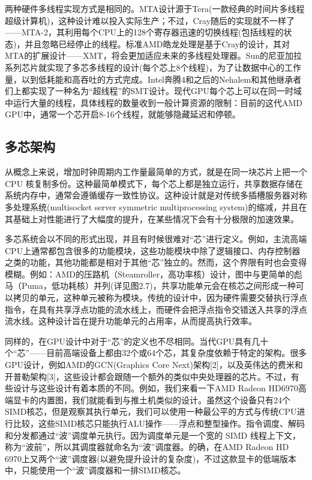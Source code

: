
两种硬件多线程实现方式是相同的。MTA设计源于Tera(一款经典的时间片多线程超级计算机)，这种设计难以投入实际生产；不过，Cray随后的实现就不一样了——MTA-2，其利用每个CPU上的128个寄存器迅速的切换线程(包括线程的状态)，并且忽略已经停止的线程。标准AMD皓龙处理是基于Cray的设计，其对MTA的扩展设计——XMT，将会更加适应未来的多线程处理器。Sun的尼亚加拉系列芯片就实现了多芯多线程的设计(每个芯上8个线程)，为了让数据中心的工作量，以到低耗能和高吞吐的方式完成。Intel奔腾4和之后的Nehalem和其他继承者们上都实现了一种名为“超线程”的SMT设计。现代GPU每个芯上可以在同一时域中运行大量的线程，具体线程的数量收到一般计算资源的限制：目前的这代AMD GPU中，通常一个芯开启8-16个线程，就能够隐藏延迟和停顿。

\subsection{多芯架构}

从概念上来说，增加时钟周期内工作量最简单的方式，就是在同一块芯片上把一个 CPU 核复制多份。这种最简单模式下，每个芯上都是独立运行，共享数据存储在系统内存中，通常会遵循缓存一致性协议。这种设计就是对传统多插槽服务器对称多处理系统(multisocket server symmetric multiprocessing system)的缩减，并且在其基础上对性能进行了大幅度的提升，在某些情况下会有十分极限的加速效果。

多芯系统会以不同的形式出现，并且有时候很难对“芯”进行定义。例如，主流高端CPU上通常都包含很多的功能模块，这些功能模块中除了逻辑接口、内存控制器之类的功能，其他功能都是相对于其他“芯”独立的。然而，这个界限有时也会变得模糊。例如：AMD的压路机（Steamroller，高功率核）设计，图中与更简单的彪马（Puma，低功耗核）并列(详见图2.7)，共享功能单元会在核芯之间形成一种可以拷贝的单元，这种单元被称为模块。传统的设计中，因为硬件需要交替执行浮点指令，在具有共享浮点功能的流水线上，而硬件会把浮点指令交错送入共享的浮点流水线。这种设计旨在提升功能单元的占用率，从而提高执行效率。


同样的，在GPU设计中对于“芯”的定义也不尽相同。当代GPU具有几十个“芯”——目前高端设备上都由32个或64个芯，其复杂度依赖于特定的架构。很多GPU设计，例如AMD的GCN(Graphics Core Next)架构[2]，以及英伟达的费米和开普勒架构[3]，这些设计都会跟随一个额外的类似中央处理器的芯片。不过，有些设计与这些设计有着本质的不同。例如，我们来看一下AMD Radeon HD6970高端显卡的内置图，我们就能看到与推土机类似的设计。虽然这个设备只有24个SIMD核芯，但是观察其执行单元，我们可以使用一种最公平的方式与传统CPU进行比较，这些SIMD核芯只能执行ALU操作——浮点和整型操作。指令调度、解码和分发都通过“波”调度单元执行。因为调度单元是一个宽的 SIMD 线程上下文，称为“波前”，所以其调度器就命名为“波”调度器。的确，在AMD Radeon HD 6970上又两个“波”调度器(以避免提升设计的复杂度)，不过这款显卡的低端版本中，只能使用一个“波”调度器和一排SIMD核芯。

